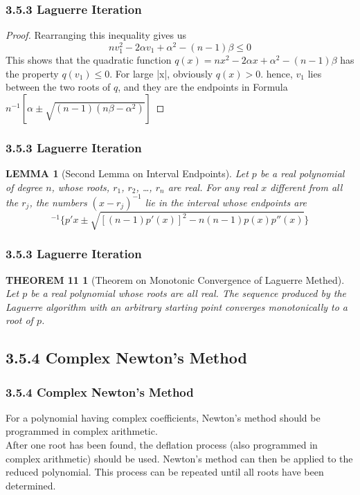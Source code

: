 \documentclass[notheorems,mathserif,table,compress]{beamer}  %
\begin{document}
\begin{frame}
  \frametitle{3.5.3 Laguerre Iteration}
  \begin{proof}
  Rearranging this inequality gives us
  \begin{displaymath}
  nv_1^2-2\alpha v_1+\alpha^2-(n-1)\beta \le0
  \end{displaymath}
  This shows that the quadratic function $q(x)=nx^2-2\alpha x+\alpha^2-(n-1)\beta$ has the property $q(v_1)\le0$. For large |x|, obviously $q(x)>0$. hence, $v_1$ lies between the two roots of $q$, and they are the endpoints in Formula $n^{-1}[\alpha \pm \sqrt{(n-1)(n\beta-\alpha^2)}]$
  \end{proof}
\end{frame}


\begin{frame}
  \frametitle{3.5.3 Laguerre Iteration}
  \newtheorem{lemma 2}[lemma 1]{LEMMA}
  \begin{lemma 2}[Second Lemma on Interval Endpoints]
  Let $p$ be a real polynomial of degree $n$, whose roots, $r_1$, $r_2$, \ldots , $r_n$ are real. For any real $x$ different from all the $r_j$, the numbers $(x-r_j)^{-1}$ lie in the interval whose endpoints are
  \begin{displaymath}
  [n p(x)]^{-1}\big \{p'{x}\pm \sqrt{[(n-1)p'(x)]^2-n(n-1)p(x)p''(x)}\big \}
  \end{displaymath}
  \end{lemma 2} 
\end{frame}


\begin{frame}
  \frametitle{3.5.3 Laguerre Iteration}
  \newtheorem*{theorem 11}{THEOREM 11}
  \begin{theorem 11}[Theorem on Monotonic Convergence of Laguerre Methed]
  Let $p$ be a real polynomial whose roots are all real. The sequence produced by the Laguerre algorithm with an arbitrary starting point converges monotonically to a root of $p$.
  \end{theorem 11}
\end{frame}


\subsection{3.5.4 Complex Newton's Method}



\begin{frame}
  \frametitle{3.5.4 Complex Newton's Method}
  For a polynomial having complex coefficients, Newton's method should be programmed in complex arithmetic. \\
  After one root has been found, the deflation process (also programmed in complex arithmetic) should be used. Newton's method can then be applied to the reduced polynomial. This process can be repeated until all roots have been determined.
\end{frame}
\end{document}
